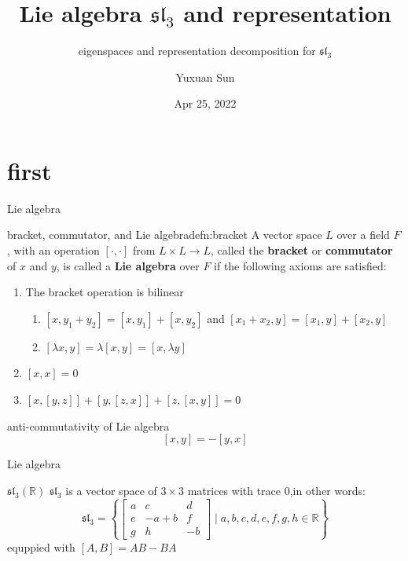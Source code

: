 \documentclass{beamer}
\title{Lie algebra $\mathfrak{sl}_3$ and representation}
\subtitle{eigenspaces and representation decomposition for $\mathfrak{sl}_3$}
\date{Apr 25, 2022}
\author{Yuxuan Sun}
\institute{Haverford College}
\newcommand{\R}{\mathbb{R}}
\begin{document}
	
\begin{frame}
\titlepage
\end{frame}

\section{first}

\begin{frame}{Lie algebra}

	\begin{defn}{bracket, commutator, and Lie algebra}{defn:bracket}
	A vector space $L$ over a field $F$, with an operation $\left[ \cdot, \cdot \right] $ from $L \times L \to  L$, called the  \textbf{bracket} or \textbf{commutator} of $x$ and  $y$, is called a  \textbf{Lie algebra} over $F$ if the following axioms are satisfied:
\begin{enumerate}
		 \item The bracket operation is bilinear
\begin{enumerate}
	\item $[x,y_1+y_2] = [x,y_1] + [x,y_2]$ and $[x_1+x_2,y] = [x_1,y] + [x_2,y]$
	\item $[\lambda x, y] = \lambda[x,y] = [x, \lambda y]$
\end{enumerate}
		 \item $[x,x] = 0$
		 \item $[x,[y,z]]+[y,[z,x]] +[z,[x,y]] = 0$
	\end{enumerate}
\end{defn}
\begin{theom}{anti-commutativity of Lie algebra}{}
		\[
			[x,y] = -[y,x]
		\] 
\end{theom}	

\end{frame}



\begin{frame}{Lie algebra}

\begin{exm}{$\mathfrak{sl}_3(\R)$}{}
	$\mathfrak{sl}_{3}$ is a vector space of $3 \times 3$ matrices with trace 0,in other words:  \[
		\mathfrak{sl}_{3} = \left\{ \begin{bmatrix} a & c & d \\
		e & -a+b & f \\ g & h & -b\end{bmatrix} \mid a,b,c,d,e,f,g,h \in \R \right\} 
			\] equppied with $[A,B] = AB - BA$
\end{exm}

\end{frame}
\end{document}
